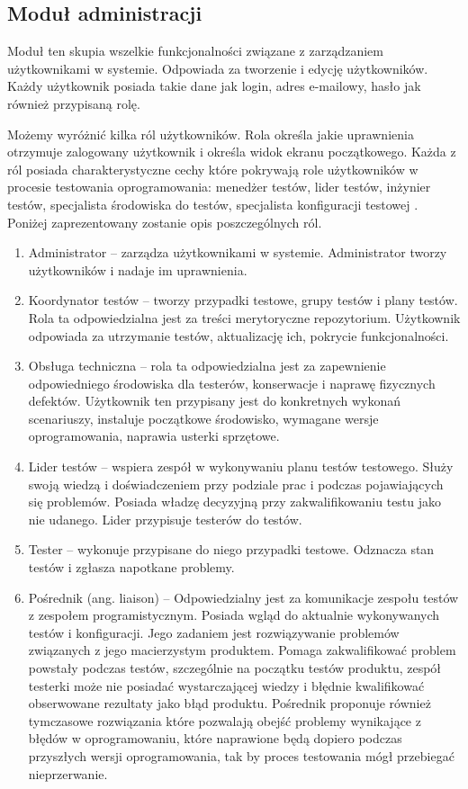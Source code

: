 \subsection{Moduł administracji}

Moduł ten skupia wszelkie funkcjonalności związane z zarządzaniem użytkownikami w systemie. Odpowiada za tworzenie i edycję użytkowników. Każdy użytkownik posiada takie dane jak login, adres e-mailowy, hasło jak również przypisaną rolę.

Możemy wyróżnić kilka ról użytkowników. Rola określa jakie uprawnienia otrzymuje zalogowany użytkownik i określa widok ekranu początkowego. Każda z ról posiada charakterystyczne cechy które pokrywają role użytkowników w procesie testowania oprogramowania: menedżer testów, lider testów, inżynier testów, specjalista środowiska do testów, specjalista konfiguracji testowej \cite{peopleWare}. Poniżej zaprezentowany zostanie opis poszczególnych ról.
\begin{enumerate}
  \item Administrator --  zarządza użytkownikami w systemie. Administrator tworzy użytkowników i nadaje im uprawnienia.
  \item Koordynator testów -- tworzy przypadki testowe, grupy testów i plany testów. Rola ta odpowiedzialna jest za treści merytoryczne repozytorium. Użytkownik odpowiada za utrzymanie testów, aktualizację ich, pokrycie funkcjonalności. 
  \item Obsługa techniczna -- rola ta odpowiedzialna jest za zapewnienie odpowiedniego środowiska dla testerów, konserwacje i naprawę fizycznych defektów. Użytkownik ten przypisany jest do konkretnych wykonań scenariuszy, instaluje początkowe środowisko, wymagane wersje oprogramowania, naprawia usterki sprzętowe.
  \item Lider testów -- wspiera zespół w wykonywaniu planu testów testowego. Służy swoją wiedzą i doświadczeniem przy podziale prac i podczas pojawiających się problemów. Posiada władzę decyzyjną przy zakwalifikowaniu testu jako nie udanego. Lider przypisuje testerów do testów.
  \item Tester --  wykonuje przypisane do niego przypadki testowe. Odznacza stan testów i zgłasza napotkane problemy.
  \item Pośrednik (ang. liaison) --  Odpowiedzialny jest za komunikacje zespołu testów z zespołem programistycznym. Posiada wgląd do aktualnie wykonywanych testów i konfiguracji. Jego zadaniem jest rozwiązywanie problemów związanych z jego macierzystym produktem. Pomaga zakwalifikować problem powstały podczas testów, szczególnie na początku testów produktu, zespół testerki może nie posiadać wystarczającej wiedzy i błędnie kwalifikować obserwowane rezultaty jako błąd produktu. Pośrednik proponuje również tymczasowe rozwiązania które pozwalają obejść problemy wynikające z błędów w oprogramowaniu, które naprawione będą dopiero podczas przyszłych wersji oprogramowania, tak by proces testowania mógł przebiegać nieprzerwanie.
\end{enumerate}
  

